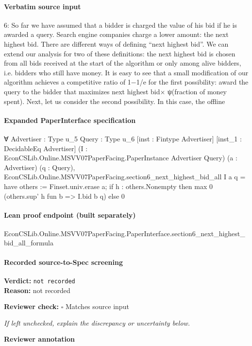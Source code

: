 \documentclass[10pt]{article}
\newcommand{\reviewerbox}{%
  \par\noindent\fbox{\parbox{0.96\linewidth}{\rule{0pt}{0.38in}}}\par
}
\newcommand{\reviewmatch}[1]{%
  \par\noindent\textbf{Reviewer check:} $\square$\; #1\par
  \noindent\emph{If left unchecked, explain the discrepancy or uncertainty below.}\par
}
\begin{document}
\paragraph{Verbatim source input}
\begin{ReviewVerbatim}
6: So far we have assumed that a bidder is charged the value of his bid if he is awarded a query.
Search engine companies charge a lower amount: the next highest bid. There are different ways
of defining “next highest bid”. We can extend our analysis for two of these definitions: the
next highest bid is chosen from all bids received at the start of the algorithm or only among
alive bidders, i.e. bidders who still have money.
It is easy to see that a small modification of our algorithm achieves a competitive ratio of
1−1/e for the first possibility: award the query to the bidder that maximizes next highest bid×
ψ(fraction of money spent). Next, let us consider the second possibility. In this case, the offline
\end{ReviewVerbatim}


\paragraph{Expanded PaperInterface specification}
\begin{ReviewVerbatim}
∀ {Advertiser : Type u_5} {Query : Type u_6} [inst : Fintype Advertiser] [inst_1 : DecidableEq Advertiser]
  (I : EconCSLib.Online.MSVV07PaperFacing.PaperInstance Advertiser Query) (a : Advertiser) (q : Query),
  EconCSLib.Online.MSVV07PaperFacing.section6_next_highest_bid_all I a q =
    have others := Finset.univ.erase a;
    if h : others.Nonempty then max 0 (others.sup' h fun b => I.bid b q) else 0
\end{ReviewVerbatim}

\paragraph{Lean proof endpoint (built separately)}\begin{ReviewVerbatim}
EconCSLib.Online.MSVV07PaperFacing.PaperInterface.section6_next_highest_bid_all_formula
\end{ReviewVerbatim}

\paragraph{Recorded source-to-Spec screening}
\textbf{Verdict:} \texttt{not recorded}
\\
\textbf{Reason:} not recorded
\reviewmatch{Matches source input}
\noindent\textbf{Reviewer annotation}\par
\reviewerbox
\clearpage
\hypertarget{source-claim-d54c7e56ec441d30}{}
\end{document}

